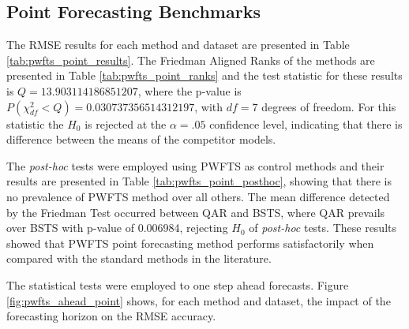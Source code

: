 \subsection{Point Forecasting Benchmarks}
\label{sec:pwfts_experiments_point}

The RMSE results for each method and dataset are presented in Table \ref{tab:pwfts_point_results}. The Friedman Aligned Ranks of the methods are presented in Table \ref{tab:pwfts_point_ranks} and the test statistic for these results is $Q = 13.903114186851207$, where the p-value is $P(\chi^2_{df} < Q) = 0.030737356514312197$, with $df=7$ degrees of freedom. For this statistic the $H_0$ is rejected at the $\alpha=.05$ confidence level, indicating that there is difference between the means of the competitor models.

The \textit{post-hoc} tests were employed using PWFTS as control methods and their results are presented in Table \ref{tab:pwfts_point_posthoc}, showing that there is no prevalence of PWFTS method over all others. The mean difference detected by the Friedman Test occurred between QAR and BSTS, where QAR prevails over BSTS with p-value of 0.006984, rejecting $H_0$ of \textit{post-hoc} tests. These results showed that PWFTS point forecasting method performs satisfactorily when compared with the standard methods in the literature. 

The statistical tests were employed to one step ahead forecasts. Figure \ref{fig:pwfts_ahead_point} shows, for each method and dataset, the impact of the forecasting horizon on the RMSE accuracy.

\begin{table}[htb]
    \caption{RMSE for one step ahead point forecasts}
    \label{tab:pwfts_point_results}
\end{table}

